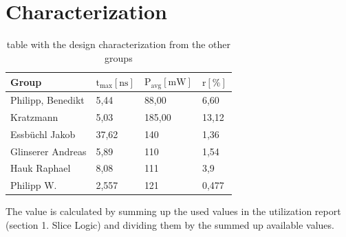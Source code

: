 \documentclass[%
	a4paper,
]
{article}
\begin{document}













\section{Characterization}
\begin{table}[ht]
    \centering
    \begin{tabular}{l|lll}
         Group & $\text{t}_\text{{max}} [\text{ns}]	$ & $\text{P}_\text{avg} [\text{mW}]$ & $\text{r} [\%] $ \\ \hline \hline
        Philipp, Benedikt &	5,44	& 88,00	& 6,60 \\
        Kratzmann &	5,03 &	185,00 & 13,12 \\
        Essbüchl Jakob &	37,62 &	140	& 1,36 \\
        Glinserer Andreas &	5,89 &	110	& 1,54 \\ 
        Hauk Raphael &	8,08 &	111 &	3,9 \\
        Philipp W. &	2,557 &	121 &	0,477\\
        \hline
    \end{tabular}
    \caption{table with the design characterization from the other groups}
    \label{tab:characterization}
\end{table}
The value is calculated by summing up the used values in the utilization report
(section 1. Slice Logic)
and dividing them
by the summed up available values.
\end{document}
